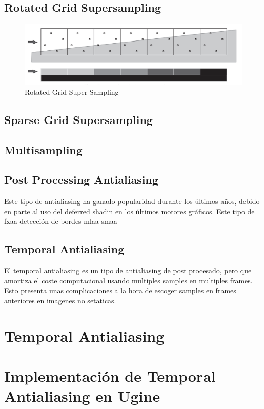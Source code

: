 \documentclass[withindex, glossary]{cam-thesis}
\begin{document}
\section{Rotated Grid Supersampling}
\begin{figure}
    \includegraphics[width=\linewidth]{figures/rgss.png}
    \caption{Rotated Grid Super-Sampling\cite{Beets2000SupersamplingAA}}
    \label{fig:rgss}
\end{figure}

\section{Sparse Grid Supersampling}

\section{Multisampling}

\section{Post Processing Antialiasing}

Este tipo de antialiasing ha ganado popularidad durante los últimos años, debido en parte al uso del deferred shadin en los últimos motores gráficos. Este tipo de
fxaa detección de bordes
mlaa
smaa

\section{Temporal Antialiasing}

El temporal antialiasing es un tipo de antialiasing de post procesado, pero que amortiza el coste computacional usando multiples samples en multiples frames. Esto presenta unas complicaciones a la hora de escoger samples en frames anteriores en imagenes no setaticas.

\chapter{Temporal Antialiasing}

\chapter{Implementación de Temporal Antialiasing en Ugine}


\nocite{*}
\printbibliography{}

\listoffigures
\listoftables

\printthesisindex{}
\end{document}
